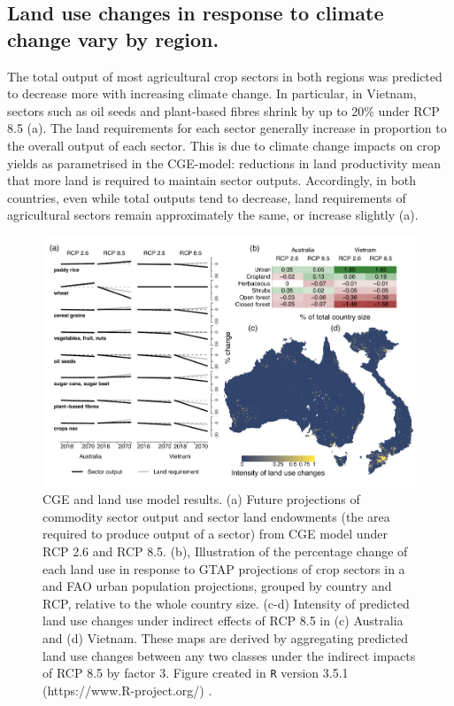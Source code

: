\documentclass[titlesmallcaps,copyrightpage]{uomthesis}\usepackage[]{graphicx}\usepackage[]{color}
\begin{document}
\subsection{Land use changes in response to climate change vary by region.}
The total output of most agricultural crop sectors in both regions was predicted to decrease more with increasing climate change. In particular, in Vietnam, sectors such as oil seeds and plant-based fibres shrink by up to 20\% under RCP 8.5 (a). The land requirements for each sector generally increase in proportion to the overall output of each sector. This is due to climate change impacts on crop yields as parametrised in the CGE-model: reductions in land productivity mean that more land is required to maintain sector outputs. Accordingly, in both countries, even while total outputs tend to decrease, land requirements of agricultural sectors remain approximately the same, or increase slightly (a).

\begin{figure}[htb]
  \centering
  \includegraphics[width=\textwidth]{chapters/figures/chapter2/fig3.pdf}
  \caption{CGE and land use model results. (a) Future projections of commodity sector output and sector land endowments (the area required to produce output of a sector) from CGE model under RCP 2.6 and RCP 8.5. (b), Illustration of the percentage change of each land use in response to GTAP projections of crop sectors in a and FAO urban population projections, grouped by country and RCP, relative to the whole country size. (c-d) Intensity of predicted land use changes under indirect effects of RCP 8.5 in (c) Australia and (d) Vietnam. These maps are derived by aggregating predicted land use changes between any two classes under the indirect impacts of RCP 8.5 by factor 3.  Figure created in \texttt{R} version 3.5.1 (https://www.R-project.org/) \citep{r_development_core_team_r_2008}.}
  \label{ch2:fig3}
\end{figure}
\end{document}
